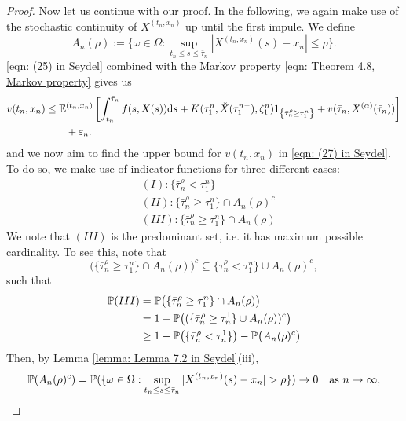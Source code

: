 \begin{proof}
    Now let us continue with our proof. In the following, we again make use of the stochastic continuity of $X^{(t_n,x_n)}$ up until the first impule. We define 
    \begin{equation*}
        A_n(\rho) := \big\{ \omega \in \Omega : \sup_{t_n \leq s \leq \bar \tau_n} |X^{(t_n,x_n)}(s) - x_n| \leq \rho\big\}.
    \end{equation*}
    \eqref{eqn: (25) in Seydel} combined with the Markov property \eqref{eqn: Theorem 4.8, Markov property} gives us
    \begin{align}
        v(t_n,x_n) &\leq \mathbb{E}^{(t_n,x_n)} \left[ \int_{t_n}^{\bar \tau_n} f(s,X(s)) \mathrm{d} s + K(\tau_1^n, \check X (\tau_1^{n-}), \zeta_1^n) 1_{\left\{ \bar \tau_n^\rho \geq \tau_1^n\right\}} + v(\bar \tau_n, X^{(\alpha)}(\bar \tau_n)) \right] \nonumber \\
        & \qquad + \varepsilon_n.
        \label{eqn: (27) in Seydel}
    \end{align}
    and we now aim to find the upper bound for $v(t_n,x_n)$ in \eqref{eqn: (27) in Seydel}. To do so, we make use of indicator functions for three different cases:
    \begin{align*}
        &(I): \{\bar \tau_n^\rho < \tau_1^n\} \\
        &(II): \{\bar \tau_n^\rho \geq \tau_1^n \} \cap A_n(\rho)^c \\
        &(III): \{\bar \tau_n^\rho \geq \tau_1^n \} \cap A_n(\rho)
    \end{align*}
    We note that $(III)$ is the predominant set, i.e. it has maximum possible cardinality. To see this, note that 
    \begin{equation*}
        \big( \{\bar \tau_n^\rho \geq \tau_1^n \} \cap A_n(\rho) \big)^c \subseteq \{\tau_n^\rho < \tau_1^n \} \cup A_n(\rho)^c,
    \end{equation*}
    such that 
    \begin{align}
        \mathbb{P}(III) &= \mathbb{P} \big( \{ \bar \tau_n^\rho \geq \tau_1^n\} \cap A_n(\rho) \big) \nonumber \\
        &= 1 - \mathbb{P} \big( (\{\bar \tau_n^\rho \geq \tau_n^1\} \cup A_n(\rho))^c \big) \nonumber \\
        & \geq 1 - \mathbb{P}\big( \{\bar \tau_n^\rho < \tau_n^1\} \big) - \mathbb{P}\big(A_n(\rho)^c\big)
        \label{eqn: Theorem 4.8, temporary result 5}
    \end{align}
    Then, by Lemma \ref{lemma: Lemma 7.2 in Seydel}(iii), 
    \begin{equation*}
        \Prob (A_n(\rho)^c) = \Prob(\{ \omega \in \Omega: \sup_{t_n \leq s \leq \bar \tau_n} |X^{(t_n,x_n)}(s) - x_n| > \rho\}) \rightarrow 0 \quad \text{as } n \rightarrow \infty,

\end{equation*}
\end{proof}
